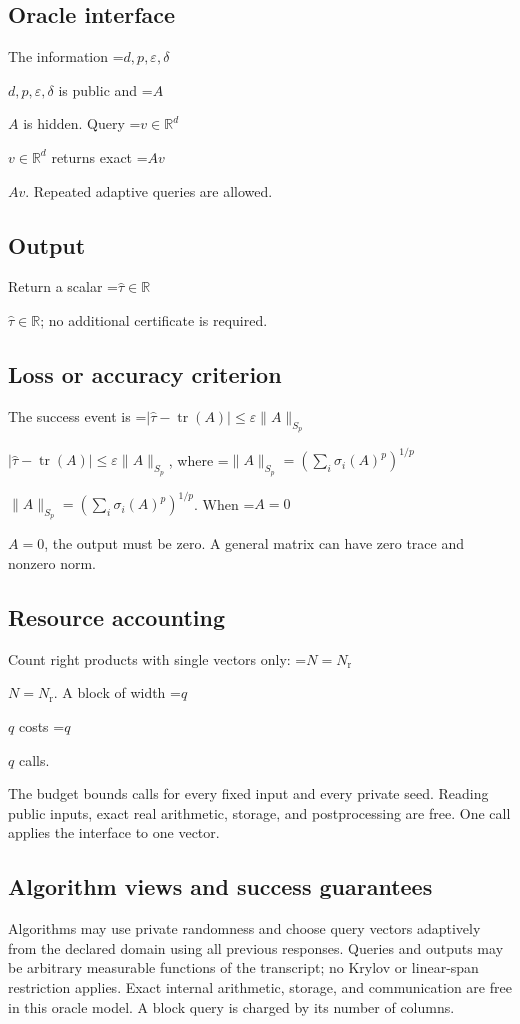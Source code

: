 \documentclass[10pt,a4paper]{article}
\newcommand{\AtlasMath}[1]{\par\begingroup\centering\setbox0=\hbox{$\displaystyle #1$}\ifdim\wd0>1.4\linewidth\typeout{ATLAS WIDE FORMULA: \the\wd0}\fi\ifdim\wd0>\linewidth\resizebox{\linewidth}{!}{\box0}\else\box0\fi\par\endgroup}
\newcommand{\AtlasInlineMath}[1]{\begingroup\setbox0=\hbox{$#1$}\ifdim\wd0>.4\linewidth\endgroup\AtlasMath{#1}\else\endgroup$#1$\fi}
\begin{document}
\subsection{Oracle interface}
The information \AtlasInlineMath{d,p,\varepsilon,\delta} is public and \AtlasInlineMath{A} is hidden. Query \AtlasInlineMath{v\in\mathbb{R}^d} returns exact \AtlasInlineMath{Av}. Repeated adaptive queries are allowed.

\subsection{Output}
Return a scalar \AtlasInlineMath{\widehat\tau\in\mathbb{R}}; no additional certificate is required.

\subsection{Loss or accuracy criterion}
The success event is \AtlasInlineMath{|\widehat\tau-\operatorname{tr}(A)|\le\varepsilon\|A\|_{S_p}}, where \AtlasInlineMath{\|A\|_{S_p}=(\sum_i\sigma_i(A)^p)^{1/p}}. When \AtlasInlineMath{A=0}, the output must be zero. A general matrix can have zero trace and nonzero norm.

\subsection{Resource accounting}
Count right products with single vectors only: \AtlasInlineMath{N=N_{\mathrm r}}. A block of width \AtlasInlineMath{q} costs \AtlasInlineMath{q} calls.

The budget bounds calls for every fixed input and every private seed. Reading public inputs, exact real arithmetic, storage, and postprocessing are free. One call applies the interface to one vector.

\subsection{Algorithm views and success guarantees}
Algorithms may use private randomness and choose query vectors adaptively from the declared domain using all previous responses. Queries and outputs may be arbitrary measurable functions of the transcript; no Krylov or linear-span restriction applies. Exact internal arithmetic, storage, and communication are free in this oracle model. A block query is charged by its number of columns.
\end{document}

